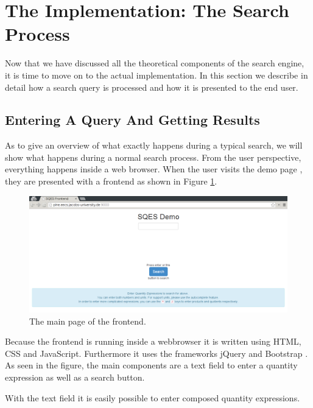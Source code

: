 \section{The Implementation: The Search Process}
\label{sec:pit}

Now that we have discussed all the theoretical components of the search engine, it is time to move on to the actual implementation. In this section we describe in detail how a search query is processed and how it is presented to the end user.

\subsection{Entering A Query And Getting Results}

As to give an overview of what exactly happens during a typical search, we will show what happens during a normal search process. From the user perspective, everything happens inside a web browser. When the user visits the demo page \cite{self:sqesdemo}, they are presented with a frontend as shown in Figure \ref{fig:frontmain}.

\begin{figure}[h]
  \begin{center}
    \includegraphics[width=\textwidth]{img/screen1.png}
  \end{center}
  \caption{The main page of the frontend. }
  \label{fig:frontmain}
\end{figure}

Because the frontend is running inside a webbrowser it is written using HTML, CSS and JavaScript. Furthermore it uses the frameworks jQuery \cite{lib:jquery} and Bootstrap \cite{lib:bootstrap}. As seen in the figure, the main components are a text field to enter a quantity expression as well as a search button.

With the text field it is easily possible to enter composed quantity expressions.


